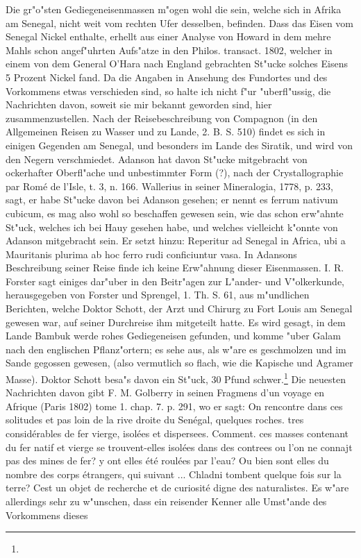 \documentclass[a4paper, 11pt, oneside, polutonikogreek, german]{article}
\begin{document}
Die gr"o"sten Gediegeneisenmassen m"ogen wohl die sein, welche sich in Afrika am Senegal, nicht weit vom rechten Ufer desselben, befinden. Dass das Eisen vom Senegal Nickel enthalte, erhellt aus einer Analyse von Howard in dem mehre Mahls schon angef"uhrten Aufs"atze in den Philos. transact. 1802, welcher in einem von dem General O'Hara nach England gebrachten St"ucke solches Eisens 5 Prozent Nickel fand. Da die Angaben in Ansehung des Fundortes und des Vorkommens etwas verschieden sind, so halte ich nicht f"ur "uberfl"ussig, die Nachrichten davon, soweit sie mir bekannt geworden sind, hier zusammenzustellen. Nach der Reisebeschreibung von Compagnon (in den Allgemeinen Reisen zu Wasser und zu Lande, 2. B. S. 510) findet es sich in einigen Gegenden am Senegal, und besonders im Lande des Siratik, und wird von den Negern verschmiedet. Adanson hat davon St"ucke mitgebracht von ockerhafter Oberfl"ache und unbestimmter Form (?), nach der Crystallographie par Romé de l'Isle, t. 3, n. 166. Wallerius in seiner Mineralogia, 1778, p. 233, sagt, er habe St"ucke davon bei Adanson gesehen; er nennt es ferrum nativum cubicum, es mag also wohl so beschaffen gewesen sein, wie das schon erw"ahnte St"uck, welches ich bei Hauy gesehen habe, und welches vielleicht k"onnte von Adanson mitgebracht sein. Er setzt hinzu: Reperitur ad Senegal in Africa, ubi a Mauritanis plurima ab hoc ferro rudi conficiuntur vasa. In Adansons Beschreibung seiner Reise finde ich keine Erw"ahnung dieser Eisenmassen. I. R. Forster sagt einiges dar"uber in den Beitr"agen zur L"ander- und V"olkerkunde, herausgegeben von Forster und Sprengel, 1. Th. S. 61, aus m"undlichen Berichten, welche Doktor Schott, der Arzt und Chirurg zu Fort Louis am Senegal gewesen war, auf seiner Durchreise ihm mitgeteilt hatte. Es wird gesagt, in dem Lande Bambuk werde rohes Gediegeneisen gefunden, und komme "uber Galam nach den englischen Pflanz"ortern; es sehe aus, als w"are es geschmolzen und im Sande gegossen gewesen, (also vermutlich so flach, wie die Kapische und Agramer Masse). Doktor Schott besa"s davon ein St"uck, 30 Pfund schwer.\footnote{} Die neuesten Nachrichten davon gibt F. M. Golberry in seinen Fragmens d'un voyage en Afrique (Paris 1802) tome 1. chap. 7. p. 291, wo er sagt: On rencontre dans ces solitudes et pas loin de la rive droite du Senégal, quelques roches. tres considérables de fer vierge, isolées et dispersees. Comment. ces masses contenant du fer natif et vierge se trouvent-elles isolées dans des contrees ou l'on ne connajt pas des mines de fer? y ont elles été roulées par l'eau? Ou bien sont elles du nombre des corps étrangers, qui suivant ... Chladni tombent quelque fois sur la terre? Cest un objet de recherche et de curiosité digne des naturalistes. Es w"are allerdings sehr zu w"unschen, dass ein reisender Kenner alle Umst"ande des Vorkommens dieses 
\end{document}
